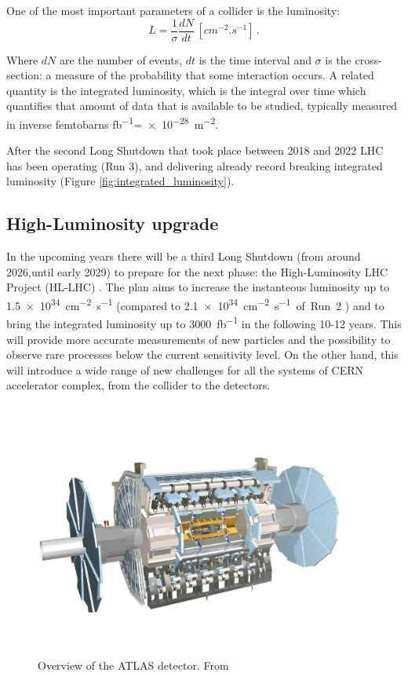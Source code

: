 One of the most important parameters of a collider is the luminosity:
\begin{equation}
    L = \frac{1}{\sigma}\frac{dN}{dt} \, \left[\unit{cm^{-2}.s^{-1}}\right] \, .
\end{equation}

Where $dN$ are the number of events, $dt$ is the time interval and $\sigma$ is the cross-section: a measure of the probability that some interaction occurs. A related quantity is the integrated luminosity, which is the integral over time which quantifies that amount of data that is available to be studied, typically measured in inverse femtobarns \unit{\femto\barn^{-1}}=\qty{e-28}{\meter^{-2}}.

After the second Long Shutdown that took place between 2018 and 2022 LHC has been operating (Run 3), and delivering already record breaking integrated luminosity (Figure \ref{fig:integrated_luminosity}).

\subsection{High-Luminosity upgrade}
In the upcoming years there will be a third Long Shutdown (from around 2026,until early 2029) to prepare for the next phase: the High-Luminosity LHC Project (HL-LHC) \cite{cernHLLHCProject}. The plan aims to increase the instanteous luminosity up to \qty{1.5e34}{\centi\meter^{-2}\second^{-1}} (compared to \qty{2.1e34}{\centi\meter^{-2}\second^{-1} of Run 2} \cite{CERN-LHCC-2020-007}) and to bring the integrated luminosity up to \qty{3000}{\femto\barn^{-1}} in the following 10-12 years. This will provide more accurate measurements of new particles and the possibility to observe rare processes below the current sensitivity level. On the other hand, this will introduce a wide range of new challenges for all the systems of CERN accelerator complex, from the collider to the detectors.

\begin{figure}[!ht]
    \centering
    \includegraphics[width=.7\textwidth]{Images/intro/ATLAS_detector.jpg}
    \captionsetup{width=.8\linewidth}
    \caption{Overview of the ATLAS detector. From \cite{atlasDetectorTechnology}}
    \label{fig:ATLAS}
\end{figure}


